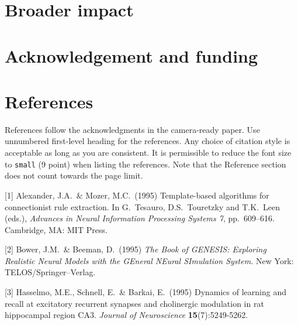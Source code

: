 \documentclass{article}
\begin{document}
\section{Broader impact}

\section{Acknowledgement and funding}


\section*{References}


References follow the acknowledgments in the camera-ready paper. Use unnumbered first-level heading for
the references. Any choice of citation style is acceptable as long as you are
consistent. It is permissible to reduce the font size to \verb+small+ (9 point)
when listing the references.
Note that the Reference section does not count towards the page limit.
\medskip


{
\small


[1] Alexander, J.A.\ \& Mozer, M.C.\ (1995) Template-based algorithms for
connectionist rule extraction. In G.\ Tesauro, D.S.\ Touretzky and T.K.\ Leen
(eds.), {\it Advances in Neural Information Processing Systems 7},
pp.\ 609--616. Cambridge, MA: MIT Press.


[2] Bower, J.M.\ \& Beeman, D.\ (1995) {\it The Book of GENESIS: Exploring
  Realistic Neural Models with the GEneral NEural SImulation System.}  New York:
TELOS/Springer--Verlag.


[3] Hasselmo, M.E., Schnell, E.\ \& Barkai, E.\ (1995) Dynamics of learning and
recall at excitatory recurrent synapses and cholinergic modulation in rat
hippocampal region CA3. {\it Journal of Neuroscience} {\bf 15}(7):5249-5262.
}


\newpage

\end{document}
